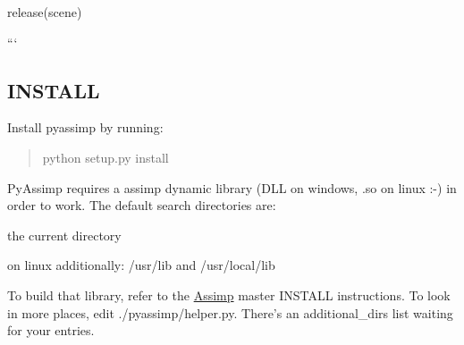 release(scene)

```

\subsection*{I\+N\+S\+T\+A\+L\+L }

Install {\ttfamily pyassimp} by running\+:

\begin{quote}
python setup.\+py install \end{quote}


Py\+Assimp requires a assimp dynamic library ({\ttfamily D\+L\+L} on windows, {\ttfamily .so} on linux \+:-\/) in order to work. The default search directories are\+:


\begin{DoxyItemize}
\item the current directory
\item on linux additionally\+: {\ttfamily /usr/lib} and {\ttfamily /usr/local/lib}
\end{DoxyItemize}

To build that library, refer to the \hyperlink{class_assimp}{Assimp} master I\+N\+S\+T\+A\+L\+L instructions. To look in more places, edit {\ttfamily ./pyassimp/helper.py}. There's an {\ttfamily additional\+\_\+dirs} list waiting for your entries. 